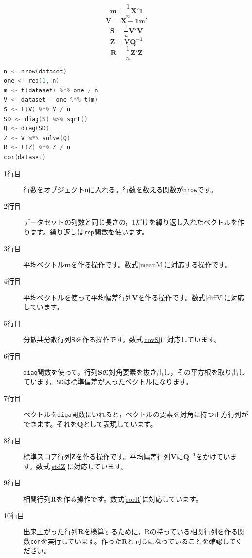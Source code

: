 \documentclass{ltjsbook}
\begin{document}
\begin{equation}\label{meanM} \bm{m} = \frac{1}{n}\bm{X'1} \end{equation}
\begin{equation}\label{diffV} \bm{V} = \bm{X}-\bm{1m'} \end{equation}
\begin{equation}\label{covS} \bm{S} = \frac{1}{n}\bm{V'V} \end{equation}
\begin{equation}\label{stdZ} \bm{Z} = \bm{VQ^{-1}} \end{equation}
\begin{equation}\label{corR} \bm{R} = \frac{1}{n}\bm{Z'Z} \end{equation}

\begin{lstlisting}[language=c++,label={code::09_07},caption={データの行列演算}]
n <- nrow(dataset)
one <- rep(1, n)
m <- t(dataset) %*% one / n
V <- dataset - one %*% t(m)
S <- t(V) %*% V / n
SD <- diag(S) %>% sqrt()
Q <- diag(SD)
Z <- V %*% solve(Q)
R <- t(Z) %*% Z / n
cor(dataset)
\end{lstlisting}
\begin{description}
    \item[1行目] 行数をオブジェクト\texttt{n}に入れる。行数を数える関数が\texttt{nrow}です。
    \item[2行目] データセットの列数と同じ長さの，1だけを繰り返し入れたベクトルを作ります。繰り返しは\texttt{rep}関数を使います。
    \item[3行目] 平均ベクトル$\bm{m}$を作る操作です。数式\ref{meanM}に対応する操作です。
    \item[4行目] 平均ベクトルを使って平均偏差行列$\bm{V}$を作る操作です。数式\ref{diffV}に対応しています。
    \item[5行目] 分散共分散行列$\bm{S}$を作る操作です。数式\ref{covS}に対応しています。
    \item[6行目] \texttt{diag}関数を使って，行列$\bm{S}$の対角要素を抜き出し，その平方根を取り出しています。\texttt{SD}は標準偏差が入ったベクトルになります。
    \item[7行目] ベクトルを\texttt{diga}関数にいれると，ベクトルの要素を対角に持つ正方行列ができます。それを$\bm{Q}$として表現しています。
    \item[8行目] 標準スコア行列$\bm{Z}$を作る操作です。平均偏差行列$\bm{V}$に$\bm{Q^{-1}}$をかけています。数式\ref{stdZ}に対応しています。
    \item[9行目] 相関行列$\bm{R}$を作る操作です。数式\ref{corR}に対応しています。
    \item[10行目] 出来上がった行列$\bm{R}$を検算するために，Rの持っている相関行列を作る関数\texttt{cor}を実行しています。作った$\bm{R}$と同じになっていることを確認してください。
\end{description}
\end{document}
